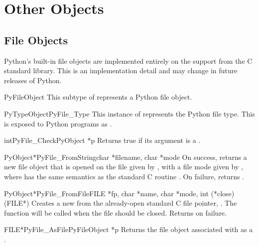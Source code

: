 \documentclass{manual}
\begin{document}
\section{Other Objects \label{otherObjects}}

\subsection{File Objects \label{fileObjects}}

Python's built-in file objects are implemented entirely on the
 support from the C standard library.  This is an
implementation detail and may change in future releases of Python.

\begin{ctypedesc}{PyFileObject}
This subtype of  represents a Python file object.
\end{ctypedesc}

\begin{cvardesc}{PyTypeObject}{PyFile_Type}
This instance of  represents the Python file
type.  This is exposed to Python programs as .
\end{cvardesc}

\begin{cfuncdesc}{int}{PyFile_Check}{PyObject *p}
Returns true if its argument is a .
\end{cfuncdesc}

\begin{cfuncdesc}{PyObject*}{PyFile_FromString}{char *filename, char *mode}
On success, returns a new file object that is opened on the
file given by , with a file mode given by ,
where  has the same semantics as the standard C routine
.  On failure, returns \NULL.
\end{cfuncdesc}

\begin{cfuncdesc}{PyObject*}{PyFile_FromFile}{FILE *fp,
                                              char *name, char *mode,
                                              int (*close)(FILE*)}
Creates a new  from the already-open standard C
file pointer, .  The function  will be called when
the file should be closed.  Returns \NULL{} on failure.
\end{cfuncdesc}

\begin{cfuncdesc}{FILE*}{PyFile_AsFile}{PyFileObject *p}
Returns the file object associated with  as a .
\end{cfuncdesc}
\end{document}
